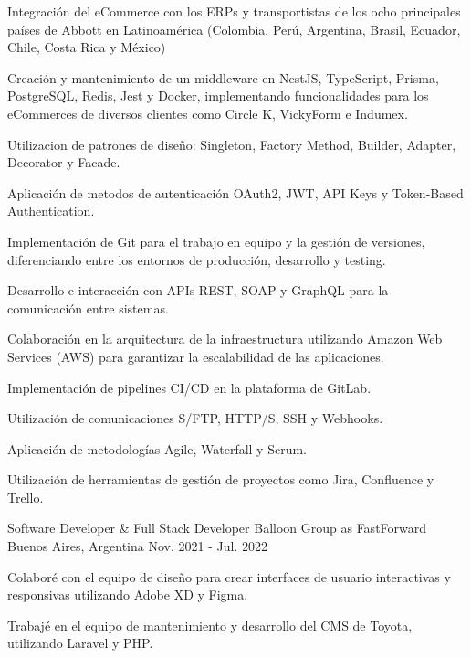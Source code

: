 \begin{cventries}
{\begin{cvitems}
        \item {Integración del eCommerce con los ERPs y transportistas de los ocho principales países de Abbott en Latinoamérica (Colombia, Perú, Argentina, Brasil, Ecuador, Chile, Costa Rica y México)}
        \item {Creación y mantenimiento de un middleware en NestJS, TypeScript, Prisma, PostgreSQL, Redis, Jest y Docker, implementando funcionalidades para los eCommerces de diversos clientes como Circle K, VickyForm e Indumex.}
        \item {Utilizacion de patrones de diseño: Singleton, Factory Method, Builder, Adapter, Decorator y Facade.}
        \item {Aplicación de metodos de autenticación OAuth2, JWT, API Keys y Token-Based Authentication.}
        \item {Implementación de Git para el trabajo en equipo y la gestión de versiones, diferenciando entre los entornos de producción, desarrollo y testing.}
        \item {Desarrollo e interacción con APIs REST, SOAP y GraphQL para la comunicación entre sistemas.}
        \item {Colaboración en la arquitectura de la infraestructura utilizando Amazon Web Services (AWS) para garantizar la escalabilidad de las aplicaciones.}
        \item {Implementación de pipelines CI/CD en la plataforma de GitLab.}
        \item {Utilización de comunicaciones S/FTP, HTTP/S, SSH y Webhooks.}
        \item {Aplicación de metodologías Agile, Waterfall y Scrum.}
        \item {Utilización de herramientas de gestión de proyectos como Jira, Confluence y Trello.}
      \end{cvitems}
    }
  \vspace{5.5mm}
  \cventry
    {Software Developer \& Full Stack Developer} %
    {Balloon Group as FastForward} %
    {Buenos Aires, Argentina} %
    {Nov. 2021 - Jul. 2022} %
    {
      \begin{cvitems} %
        \item {Colaboré con el equipo de diseño para crear interfaces de usuario interactivas y responsivas utilizando Adobe XD y Figma.}
        \item {Trabajé en el equipo de mantenimiento y desarrollo del CMS de Toyota, utilizando Laravel y PHP.}

\end{cvitems}}
\end{cventries}
